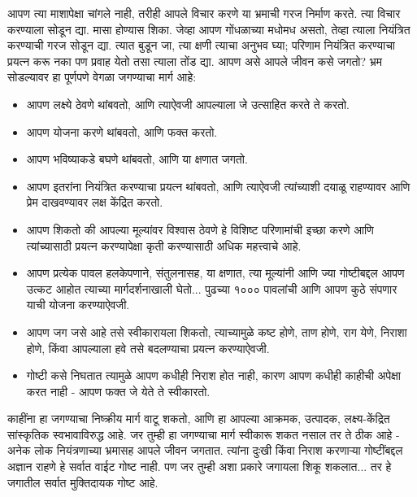 आपण त्या माशापेक्षा चांगले नाही, तरीही आपले विचार करणे या भ्रमाची गरज निर्माण करते.
त्या विचार करण्याला सोडून द्या. मासा होण्यास शिका.
जेव्हा आपण गोंधळाच्या मधोमध असतो, तेव्हा त्याला नियंत्रित करण्याची गरज सोडून द्या. त्यात बुडून जा, त्या क्षणी त्याचा अनुभव घ्या; परिणाम नियंत्रित करण्याचा प्रयत्न करू नका पण प्रवाह येतो तसा त्याला तोंड द्या.
आपण असे आपले जीवन कसे जगतो? भ्रम सोडल्यावर हा पूर्णपणे वेगळा जगण्याचा मार्ग आहे:
\begin{itemize}
\item आपण लक्ष्ये ठेवणे थांबवतो, आणि त्याऐवजी आपल्याला जे उत्साहित करते ते करतो.
\item आपण योजना करणे थांबवतो, आणि फक्त करतो.
\item आपण भविष्याकडे बघणे थांबवतो, आणि या क्षणात जगतो.
\item आपण इतरांना नियंत्रित करण्याचा प्रयत्न थांबवतो, आणि त्याऐवजी त्यांच्याशी दयाळू राहण्यावर आणि प्रेम दाखवण्यावर लक्ष केंद्रित करतो.
\item आपण शिकतो की आपल्या मूल्यांवर विश्वास ठेवणे हे विशिष्ट परिणामांची इच्छा करणे आणि त्यांच्यासाठी प्रयत्न करण्यापेक्षा कृती करण्यासाठी अधिक महत्त्वाचे आहे.
\item आपण प्रत्येक पावल हलकेपणाने, संतुलनासह, या क्षणात, त्या मूल्यांनी आणि ज्या गोष्टीबद्दल आपण उत्कट आहोत त्याच्या मार्गदर्शनाखाली घेतो... पुढच्या १००० पावलांची आणि आपण कुठे संपणार याची योजना करण्याऐवजी.
\item आपण जग जसे आहे तसे स्वीकारायला शिकतो, त्याच्यामुळे कष्ट होणे, ताण होणे, राग येणे, निराशा होणे, किंवा आपल्याला हवे तसे बदलण्याचा प्रयत्न करण्याऐवजी.
\item गोष्टी कसे निघतात त्यामुळे आपण कधीही निराश होत नाही, कारण आपण कधीही काहीची अपेक्षा करत नाही - आपण फक्त जे येते ते स्वीकारतो.
\end{itemize}
काहींना हा जगण्याचा निष्क्रीय मार्ग वाटू शकतो, आणि हा आपल्या आक्रमक, उत्पादक, लक्ष्य-केंद्रित सांस्कृतिक स्वभावाविरुद्ध आहे. जर तुम्ही हा जगण्याचा मार्ग स्वीकारू शकत नसाल तर ते ठीक आहे - अनेक लोक नियंत्रणाच्या भ्रमासह आपले जीवन जगतात. त्यांना दुःखी किंवा निराश करणाऱ्या गोष्टींबद्दल अज्ञान राहणे हे सर्वात वाईट गोष्ट नाही.
पण जर तुम्ही अशा प्रकारे जगायला शिकू शकलात... तर हे जगातील सर्वात मुक्तिदायक गोष्ट आहे.



